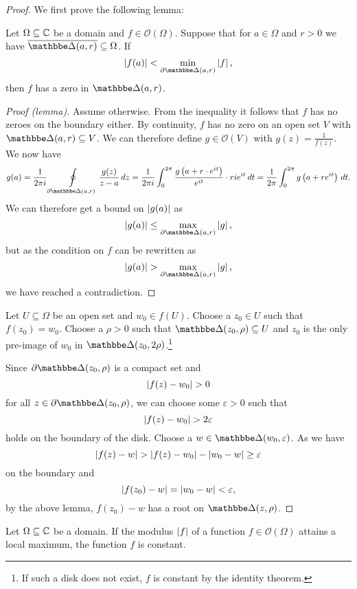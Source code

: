 \begin{proof}
We first prove the following lemma:

\begin{lema*}
Let $\Omega \subseteq \mathbb{C}$ be a domain and
$f \in \mathcal{O}(\Omega)$. Suppose that for $a \in \Omega$ and
$r > 0$ we have $\oline{\dsk(a, r)} \subseteq \Omega$. If
\[
\abs{f(a)} < \min_{\partial \dsk(a, r)} \abs{f},
\]
then $f$ has a zero in $\dsk(a, r)$.
\end{lema*}

\begin{proof}[Proof (lemma)]
Assume otherwise. From the inequality it follows that $f$ has no
zeroes on the boundary either. By continuity, $f$ has no zero on an
open set $V$ with $\dsk(a, r) \subseteq V$. We can therefore define
$g \in \mathcal{O}(V)$ with $g(z) = \frac{1}{f(z)}$. We now have
\[
g(a) =
\frac{1}{2 \pi i}
\olint_{\partial \dsk(a, r)} \frac{g(z)}{z-a}\,dz =
\frac{1}{2 \pi i}
\int_0^{2 \pi}
\frac{g \br{a + r \cdot e^{it}}}{e^{it}} \cdot r i e^{it}\,dt =
\frac{1}{2 \pi} \int_0^{2 \pi}  g \br{a + r e^{it}}\,dt.
\]
We can therefore get a bound on $\left\lvert g(a)\right\rvert$ as
\[
\abs{g(a)} \leq \max_{\partial \dsk(a, r)} \abs{g},
\]
but as the condition on $f$ can be rewritten as
\[
\abs{g(a)} > \max_{\partial \dsk(a, r)} \abs{g},
\]
we have reached a contradiction.
\end{proof}

Let $U \subseteq \Omega$ be an open set and $w_0 \in f(U)$. Choose
a $z_0 \in U$ such that $f(z_0) = w_0$. Choose a $\rho > 0$ such
that $\dsk(z_0, \rho) \subseteq U$ and $z_0$ is the only pre-image
of $w_0$ in $\dsk(z_0, 2\rho)$.\footnote{If such a disk does not
exist, $f$ is constant by the identity theorem.}

Since $\partial \dsk(z_0, \rho)$ is a compact set and
\[
\left\lvert f(z) - w_0\right\rvert > 0
\]
for all $z \in \partial \dsk(z_0, \rho)$, we can choose some
$\varepsilon > 0$ such that
\[
\left\lvert f(z) - w_0\right\rvert > 2 \varepsilon
\]
holds on the boundary of the disk. Choose a
$w \in \dsk(w_0, \varepsilon)$. As we have
\[
\left\lvert f(z) - w\right\rvert >
\left\lvert f(z) - w_0\right\rvert - \left\lvert w_0 - w\right\rvert \geq
\varepsilon
\]
on the boundary and
\[
\left\lvert f(z_0) - w\right\rvert = \left\lvert w_0 - w\right\rvert < \varepsilon,
\]
by the above lemma, $f(z_0) - w$ has a root on $\dsk(z, \rho)$.
\end{proof}

\begin{izrek}
Let $\Omega \subseteq \mathbb{C}$ be a domain. If the modulus $\left\lvert f\right\rvert$ of
a function $f \in \mathcal{O}(\Omega)$ attains a local maximum, the
function $f$ is constant.
\end{izrek}

